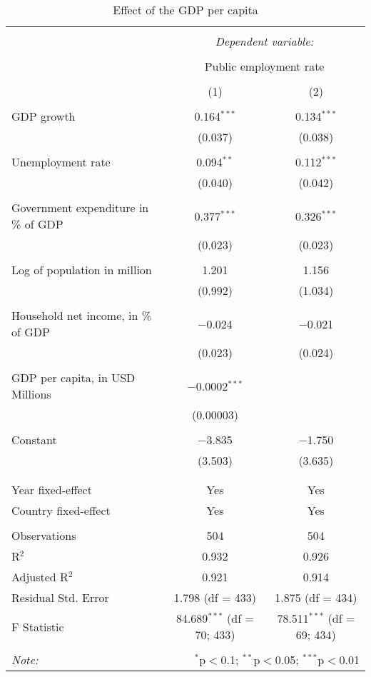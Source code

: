 
\begin{table}[!htbp] \centering 
  \caption{Effect of the GDP per capita} 
  \label{} 
\begin{tabular}{@{\extracolsep{5pt}}lcc} 
\\[-1.8ex]\hline 
\hline \\[-1.8ex] 
 & \multicolumn{2}{c}{\textit{Dependent variable:}} \\ 
\cline{2-3} 
\\[-1.8ex] & \multicolumn{2}{c}{Public employment rate} \\ 
\\[-1.8ex] & (1) & (2)\\ 
\hline \\[-1.8ex] 
 GDP growth & 0.164$^{***}$ & 0.134$^{***}$ \\ 
  & (0.037) & (0.038) \\ 
  & & \\ 
 Unemployment rate & 0.094$^{**}$ & 0.112$^{***}$ \\ 
  & (0.040) & (0.042) \\ 
  & & \\ 
 Government expenditure in \% of GDP & 0.377$^{***}$ & 0.326$^{***}$ \\ 
  & (0.023) & (0.023) \\ 
  & & \\ 
 Log of population in million & 1.201 & 1.156 \\ 
  & (0.992) & (1.034) \\ 
  & & \\ 
 Household net income, in \% of GDP & $-$0.024 & $-$0.021 \\ 
  & (0.023) & (0.024) \\ 
  & & \\ 
 GDP per capita, in USD Millions & $-$0.0002$^{***}$ &  \\ 
  & (0.00003) &  \\ 
  & & \\ 
 Constant & $-$3.835 & $-$1.750 \\ 
  & (3.503) & (3.635) \\ 
  & & \\ 
\hline \\[-1.8ex] 
Year fixed-effect & Yes & Yes \\ 
Country fixed-effect & Yes & Yes \\ 
\hline \\[-1.8ex] 
Observations & 504 & 504 \\ 
R$^{2}$ & 0.932 & 0.926 \\ 
Adjusted R$^{2}$ & 0.921 & 0.914 \\ 
Residual Std. Error & 1.798 (df = 433) & 1.875 (df = 434) \\ 
F Statistic & 84.689$^{***}$ (df = 70; 433) & 78.511$^{***}$ (df = 69; 434) \\ 
\hline 
\hline \\[-1.8ex] 
\textit{Note:}  & \multicolumn{2}{r}{$^{*}$p$<$0.1; $^{**}$p$<$0.05; $^{***}$p$<$0.01} \\ 
\end{tabular} 
\end{table} 
